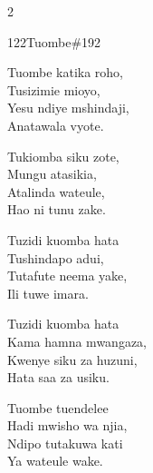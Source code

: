 \begin{multicols}{2}
\begin{hymn}{122}{Tuombe}{\#192}
\begin{stanza}
Tuombe katika roho,\\
Tusizimie mioyo,\\
Yesu ndiye mshindaji,\\
Anatawala vyote.
\end{stanza}
\begin{chorus}
Tukiomba siku zote,\\
Mungu atasikia,\\
Atalinda wateule,\\
Hao ni tunu zake.
\end{chorus}
\begin{stanza}
Tuzidi kuomba hata\\
Tushindapo adui,\\
Tutafute neema yake,\\
Ili tuwe imara.
\end{stanza}
\begin{stanza}
Tuzidi kuomba hata\\
Kama hamna mwangaza,\\
Kwenye siku za huzuni,\\
Hata saa za usiku.
\end{stanza}
\begin{stanza}
Tuombe tuendelee\\
Hadi mwisho wa njia,\\
Ndipo tutakuwa kati\\
Ya wateule wake.
\end{stanza}
\end{hymn}


\end{multicols}
